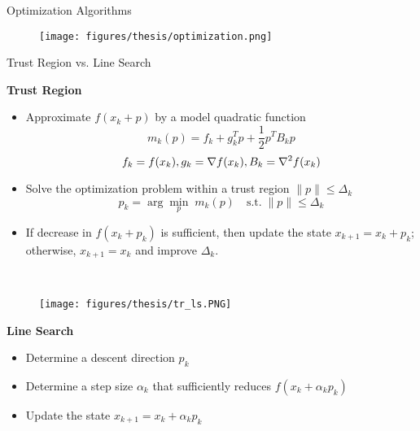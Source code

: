 \documentclass[usenames,dvipsnames]{beamer}
\begin{document}
\begin{frame}{Optimization Algorithms}
	
	
	\begin{figure}
		\centering
		\texttt{[image: figures/thesis/optimization.png]}
	\end{figure}
	
	
\end{frame}

\begin{frame}{Trust Region vs. Line Search}
	
	
	\begin{minipage}{0.6\textwidth}
		\textbf{Trust Region}
		
		\small
		
		\begin{itemize}
			\item Approximate $f(x_k + p)$ by a model quadratic function 
			$$m_k(p) = f_k + g_k^T p + \frac{1}{2}p^T B_k p$$
			$${\small f_k = f(x_k), g_k = \nabla f(x_k), B_k = \nabla^2 f(x_k)}$$
			\item Solve  the optimization problem within a trust region  $\|p\|\leq \Delta_k$
			\begin{equation*}
				p_k = \arg\min_{p} \; m_k(p) \quad	\text{s.t.} \; \|p\| \leq \Delta_k 
			\end{equation*}
			\vspace{-0.5cm}
			\item If decrease in $f(x_k + p_k)$ is sufficient, then update the state $x_{k+1} = x_k +  p_k$; otherwise, $x_{k+1} = x_k$ and improve $\Delta_k$.
		\end{itemize}
		
	\end{minipage}~
	\begin{minipage}{0.4\textwidth}
		\begin{figure}
			\centering
			\texttt{[image: figures/thesis/tr\_ls.PNG]}
		\end{figure}
		
		\textbf{Line Search}
		
		\small
		\begin{itemize}
			\item Determine a descent direction $p_k$
			\item Determine a step size $\alpha_k$ that sufficiently reduces $f(x_k + \alpha_k p_k)$
			\item Update the state $x_{k+1} = x_k + \alpha_k p_k$
		\end{itemize}
	\end{minipage}
	
	
	
	
\end{frame}
\end{document}
